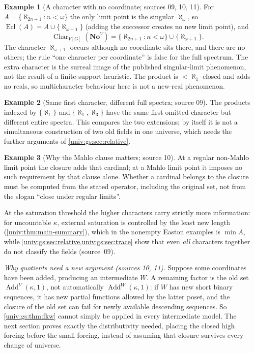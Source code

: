 \documentclass[11pt,letterpaper]{article}
\numberwithin{equation}{section}
\theoremstyle{definition}
\newtheorem{example}[example]{Example}
\theoremstyle{remark}
\newcommand{\No}{\mathbf{No}}
\newcommand{\Add}{\operatorname{Add}}
\newcommand{\Char}{\operatorname{Char}}
\newcommand{\Ecl}{\operatorname{Ecl}}
\begin{document}
\begin{example}[A character with no coordinate; sources 09, 10, 11]\label{univ:gs:ex:singular}
For $A=\{\aleph_{2n+1}:n<\omega\}$ the only limit point is the singular $\aleph_\omega$,
so $\Ecl(A)=A\cup\{\aleph_{\omega+1}\}$ (adding the successor creates no new limit
point), and
\[
 \Char_{V[G]}(\No^V)=\{\aleph_{2n+1}:n<\omega\}\cup\{\aleph_{\omega+1}\}.
\]
The character $\aleph_{\omega+1}$ occurs although no coordinate sits there, and there
are no others; the rule ``one character per coordinate'' is false for the full
spectrum. The extra character is the surreal image of the published singular-limit
phenomenon, not the result of a finite-support heuristic. The product is
$<\aleph_1$-closed and adds no reals, so multicharacter behaviour here is not a
new-real phenomenon.
\end{example}

\begin{example}[Same first character, different full spectra; source 09]\label{univ:gs:ex:samefirst}
The products indexed by $\{\aleph_1\}$ and $\{\aleph_1,\aleph_3\}$ have the same first
omitted character but different entire spectra. This compares the two extensions; by
itself it is not a simultaneous construction of two old fields in one universe, which
needs the further arguments of \cref{univ:gs:sec:relative}.
\end{example}

\begin{example}[Why the Mahlo clause matters; source 10]\label{univ:gs:ex:mahlo}
At a regular non-Mahlo limit point the closure adds that cardinal; at a Mahlo limit
point it imposes no such requirement by that clause alone. Whether a cardinal belongs
to the closure must be computed from the stated operator, including the original set,
not from the slogan ``close under regular limits''.
\end{example}

At the saturation threshold the higher characters carry strictly more information:
for uncountable $\kappa$, external saturation is controlled by the least new length
(\cref{univ:thm:main-summary}), which in the nonempty Easton examples is $\min A$,
while \cref{univ:gs:sec:relative,univ:gs:sec:trace} show that even \emph{all}
characters together do not classify the fields (source~09).

\emph{Why quotients need a new argument (sources 10, 11).} Suppose some coordinates
have been added, producing an intermediate $W$. A remaining factor is the old set
$\Add^V(\kappa,1)$, not automatically $\Add^W(\kappa,1)$: if $W$ has new short binary
sequences, it has new partial functions allowed by the latter poset, and the closure
of the old set can fail for newly available descending sequences. So
\cref{univ:gs:thm:fkw} cannot simply be applied in every intermediate model. The next
section proves exactly the distributivity needed, placing the closed high forcing
before the small forcing, instead of assuming that closure survives every change of
universe.
\end{document}
